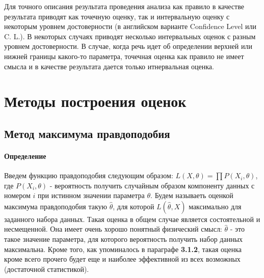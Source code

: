 Для точного описания результата проведения анализа как правило в
качестве результата приводят как точечную оценку, так и интервальную
оценку с некоторым уровнем достоверности (в английском варианте
Confidence Level или C. L.). В некоторых случаях приводят несколько
интервальных оценок с разным уровнем достоверности. В случае, когда речь
идет об определении верхней или нижней границы какого-то параметра,
точечная оценка как правило не имеет смысла и в качестве результата
дается только итнервальная оценка.



\section{Методы построения оценок}

\subsection{Метод максимума правдоподобия}


\paragraph{Определение}

Введем функцию правдоподобия следующим образом:
$L(X,\theta) = \prod{P(X_i,\theta)}$, где $P(X_i, \theta)$ -
вероятность получить случайным образом компоненту данных с номером $i$
при истинном значении параметра $\theta$. Будем называеть оценкой
максимума правдоподобия такую $\hat\theta$, для которой
$L(\hat\theta, X)$ максимально для заданного набора данных. Такая
оценка в общем случае является состоятельной и несмещенной. Она имеет
очень хорошо понятный физический смысл: $\hat\theta$ - это такое
значение параметра, для которого вероятность получить набор данных
максимальна. Кроме того, как упоминалось в параграфе \textbf{3.1.2},
такая оценка кроме всего прочего будет еще и наиболее эффективной из
всех возможных (достаточной статистикой). 

